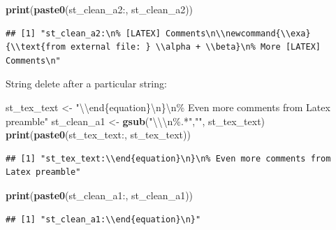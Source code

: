 \documentclass[
]{book}
\newenvironment{Shaded}{\begin{snugshade}}{\end{snugshade}}
\newcommand{\CharTok}[1]{\textcolor[rgb]{0.31,0.60,0.02}{#1}}
\newcommand{\KeywordTok}[1]{\textcolor[rgb]{0.13,0.29,0.53}{\textbf{#1}}}
\newcommand{\NormalTok}[1]{#1}
\newcommand{\StringTok}[1]{\textcolor[rgb]{0.31,0.60,0.02}{#1}}
\begin{document}
\begin{Shaded}
\begin{Highlighting}[]
\KeywordTok{print}\NormalTok{(}\KeywordTok{paste0}\NormalTok{(}\StringTok{\textquotesingle{}st\_clean\_a2:\textquotesingle{}}\NormalTok{, st\_clean\_a2))}
\end{Highlighting}
\end{Shaded}

\begin{verbatim}
## [1] "st_clean_a2:\n% [LATEX] Comments\n\\newcommand{\\exa}{\\text{from external file: } \\alpha + \\beta}\n% More [LATEX] Comments\n"
\end{verbatim}

String delete after a particular string:

\begin{Shaded}
\begin{Highlighting}[]
\NormalTok{st\_tex\_text \textless{}{-}}\StringTok{ "}\CharTok{\textbackslash{}\textbackslash{}}\StringTok{end\{equation\}}\CharTok{\textbackslash{}n}\StringTok{\}}\CharTok{\textbackslash{}n}\StringTok{\% Even more comments from Latex preamble"}
\NormalTok{st\_clean\_a1 \textless{}{-}}\StringTok{ }\KeywordTok{gsub}\NormalTok{(}\StringTok{"}\CharTok{\textbackslash{}\textbackslash{}\textbackslash{}n}\StringTok{\%.*"}\NormalTok{,}\StringTok{""}\NormalTok{, st\_tex\_text)}
\KeywordTok{print}\NormalTok{(}\KeywordTok{paste0}\NormalTok{(}\StringTok{\textquotesingle{}st\_tex\_text:\textquotesingle{}}\NormalTok{, st\_tex\_text))}
\end{Highlighting}
\end{Shaded}

\begin{verbatim}
## [1] "st_tex_text:\\end{equation}\n}\n% Even more comments from Latex preamble"
\end{verbatim}

\begin{Shaded}
\begin{Highlighting}[]
\KeywordTok{print}\NormalTok{(}\KeywordTok{paste0}\NormalTok{(}\StringTok{\textquotesingle{}st\_clean\_a1:\textquotesingle{}}\NormalTok{, st\_clean\_a1))}
\end{Highlighting}
\end{Shaded}

\begin{verbatim}
## [1] "st_clean_a1:\\end{equation}\n}"
\end{verbatim}
\end{document}
